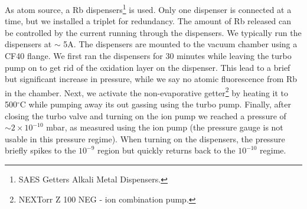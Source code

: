 As atom source, a Rb dispensers\footnote{SAES Getters Alkali Metal Dispensers.} is used.
Only one dispenser is connected at a time, but we installed a triplet for redundancy.
The amount of Rb released can be controlled by the current running through the dispensers.
We typically run the dispensers at $\sim$ 5A.
The dispensers are mounted to the vacuum chamber using a CF40 flange.
We first ran the dispensers for 30 minutes while leaving the turbo pump on to get rid of the oxidation layer on the dispenser.
This lead to a brief but significant increase in pressure, while we say no atomic fluorescence from Rb in the chamber.  
Next, we activate the non-evaporative getter\footnote{NEXTorr Z 100 NEG - ion combination pump.} by heating it to 500${}^{\circ}$C while pumping away its out gassing using the turbo pump. 
Finally, after closing the turbo valve and turning on the ion pump we reached a pressure of $\sim 2\times 10^{-10}$ mbar, as measured using the ion pump (the pressure gauge is not usable in this pressure regime).
When turning on the dispensers, the pressure briefly spikes to the $10^{-9}$ region but quickly returns back to the $10^{-10}$ regime.

